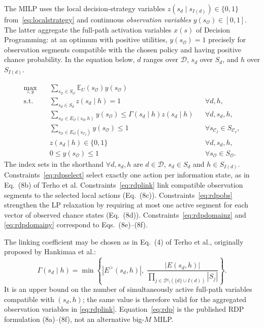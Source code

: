 \documentclass[11pt,a4paper]{article}
\begin{document}
The MILP uses the local decision-strategy variables
$z(s_d\mid s_{I(d)})\in\{0,1\}$ from~\eqref{eq:localstrategy} and
continuous \emph{observation variables}
$y(s_{\mathcal O})\in[0,1]$.  The latter aggregate the full-path
activation variables $x(s)$ of Decision Programming: at an optimum
with positive utilities, $y(s_{\mathcal O})=1$ precisely for
observation segments compatible with the chosen policy and having
positive chance probability.  In the equation below, $d$ ranges
over $\mathcal D$, $s_d$ over $S_d$, and $h$ over $S_{I(d)}$.

\begin{subequations}\label{eq:rdp}
\begin{align}
\max_{z,y}\quad
 &\sum_{s_{\mathcal O}\in S_{\mathcal O}}
       \mathbb E_U(s_{\mathcal O})y(s_{\mathcal O})
             \label{eq:rdpobj}\\
\text{s.t.}\quad
 &\sum_{s_d\in S_d}z(s_d\mid h)=1
       &&\forall d,h,\label{eq:rdpselect}\\
 &\sum_{s_{\mathcal O}\in E_{\mathcal O}(s_d,h)}
       y(s_{\mathcal O})
       \le \Gamma(s_d\mid h)z(s_d\mid h)
       &&\forall d,s_d,h,\label{eq:rdplink}\\
 &\sum_{s_{\mathcal O}\in E_{\mathcal O}(s_{\mathcal C_I})}
       y(s_{\mathcal O})\le 1
       &&\forall s_{\mathcal C_I}\in S_{\mathcal C_I},\label{eq:rdpobs}\\
 &z(s_d\mid h)\in\{0,1\}
       &&\forall d,s_d,h,\label{eq:rdpdomainz}\\
 &0\le y(s_{\mathcal O})\le1
       &&\forall s_{\mathcal O}\in S_{\mathcal O}.
       \label{eq:rdpdomainy}
\end{align}
\end{subequations}
The index sets in the shorthand $\forall d,s_d,h$ are
$d\in\mathcal D$, $s_d\in S_d$ and $h\in S_{I(d)}$.
Constraints~\eqref{eq:rdpselect} select exactly one action per
information state, as in Eq.~(8b) of Terho et al.
Constraints~\eqref{eq:rdplink} link compatible observation segments
to the selected local actions (Eq.~(8c)).
Constraints~\eqref{eq:rdpobs} strengthen the LP relaxation by
requiring at most one active segment for each vector of observed
chance states (Eq.~(8d)).  Constraints~\eqref{eq:rdpdomainz} and
\eqref{eq:rdpdomainy} correspond to Eqs.~(8e)--(8f).

The linking coefficient may be chosen as in Eq.~(4) of
Terho et al., originally proposed by Hankimaa et al.:
\begin{equation}\label{eq:gamma}
\Gamma(s_d\mid h)=\min\left\{
 |E^>(s_d,h)|,\;
 \frac{|E(s_d,h)|}
 {\displaystyle\prod_{j\in\mathcal D\setminus(\{d\}\cup I(d))}|S_j|}
\right\}.
\end{equation}
It is an upper bound on the number of simultaneously active
full-path variables compatible with $(s_d,h)$; the same value is
therefore valid for the aggregated observation variables in
\eqref{eq:rdplink}.  Equation~\eqref{eq:rdp} is the published RDP
formulation (8a)--(8f), not an alternative big-$M$ MILP.
\end{document}
